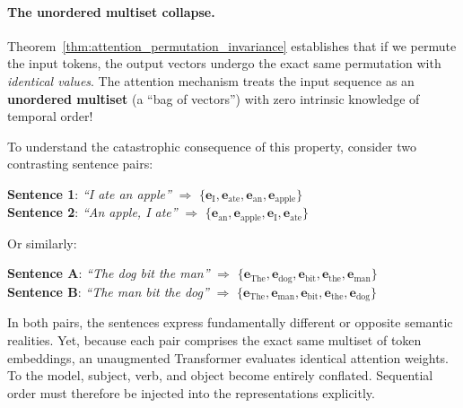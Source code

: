 \documentclass[../../main.tex]{subfiles}
\begin{document}
\paragraph{The unordered multiset collapse.}
Theorem~\ref{thm:attention_permutation_invariance} establishes that if we permute the input tokens, the output vectors undergo the exact same permutation with \emph{identical values}. The attention mechanism treats the input sequence as an \textbf{unordered multiset} (a ``bag of vectors'') with zero intrinsic knowledge of temporal order!

To understand the catastrophic consequence of this property, consider two contrasting sentence pairs:
\begin{center}
\textbf{Sentence 1}: \textit{``I ate an apple''} \quad $\Longrightarrow$ \quad $\{\mathbf{e}_{\text{I}}, \mathbf{e}_{\text{ate}}, \mathbf{e}_{\text{an}}, \mathbf{e}_{\text{apple}}\}$ \\
\textbf{Sentence 2}: \textit{``An apple, I ate''} \quad $\Longrightarrow$ \quad $\{\mathbf{e}_{\text{an}}, \mathbf{e}_{\text{apple}}, \mathbf{e}_{\text{I}}, \mathbf{e}_{\text{ate}}\}$
\end{center}
Or similarly:
\begin{center}
\textbf{Sentence A}: \textit{``The dog bit the man''} \quad $\Longrightarrow$ \quad $\{\mathbf{e}_{\text{The}}, \mathbf{e}_{\text{dog}}, \mathbf{e}_{\text{bit}}, \mathbf{e}_{\text{the}}, \mathbf{e}_{\text{man}}\}$ \\
\textbf{Sentence B}: \textit{``The man bit the dog''} \quad $\Longrightarrow$ \quad $\{\mathbf{e}_{\text{The}}, \mathbf{e}_{\text{man}}, \mathbf{e}_{\text{bit}}, \mathbf{e}_{\text{the}}, \mathbf{e}_{\text{dog}}\}$
\end{center}
In both pairs, the sentences express fundamentally different or opposite semantic realities. Yet, because each pair comprises the exact same multiset of token embeddings, an unaugmented Transformer evaluates identical attention weights. To the model, subject, verb, and object become entirely conflated. Sequential order must therefore be injected into the representations explicitly.
\end{document}
